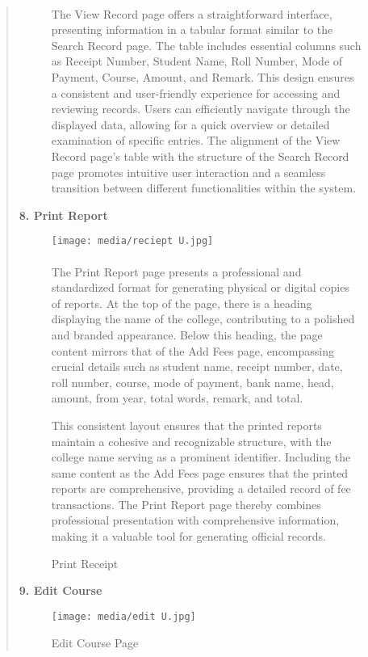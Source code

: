 \documentclass[12pt]{report}
\begin{document}
\begin{quote}
\begin{figure}[h]
			\paragraph{}
			\justifying
			The View Record page offers a straightforward interface, presenting information in a tabular format similar to the Search Record page. The table includes essential columns such as Receipt Number, Student Name, Roll Number, Mode of Payment, Course, Amount, and Remark. This design ensures a consistent and user-friendly experience for accessing and reviewing records. Users can efficiently navigate through the displayed data, allowing for a quick overview or detailed examination of specific entries. The alignment of the View Record page's table with the structure of the Search Record page promotes intuitive user interaction and a seamless transition between different functionalities within the system.
		\end{figure}
		\clearpage
		\textbf{8. Print Report }
		\begin{figure}[h]
			\centering
			\texttt{[image: media/reciept U.jpg]}\\
			\caption{Print Receipt}
			\vspace{0.5cm}
			\paragraph{}
			\justifying
			The Print Report page presents a professional and standardized format for generating physical or digital copies of reports. At the top of the page, there is a heading displaying the name of the college, contributing to a polished and branded appearance. Below this heading, the page content mirrors that of the Add Fees page, encompassing crucial details such as student name, receipt number, date, roll number, course, mode of payment, bank name, head, amount, from year, total words, remark, and total.
			
			This consistent layout ensures that the printed reports maintain a cohesive and recognizable structure, with the college name serving as a prominent identifier. Including the same content as the Add Fees page ensures that the printed reports are comprehensive, providing a detailed record of fee transactions. The Print Report page thereby combines professional presentation with comprehensive information, making it a valuable tool for generating official records.
		\end{figure}
		\clearpage
		
			\textbf{9. Edit Course }
		\begin{figure}[h]
			\centering
			\texttt{[image: media/edit U.jpg]}\\
			\caption{Edit Course Page}
			\vspace{0.5cm}

\end{figure}
\end{quote}
\end{document}
